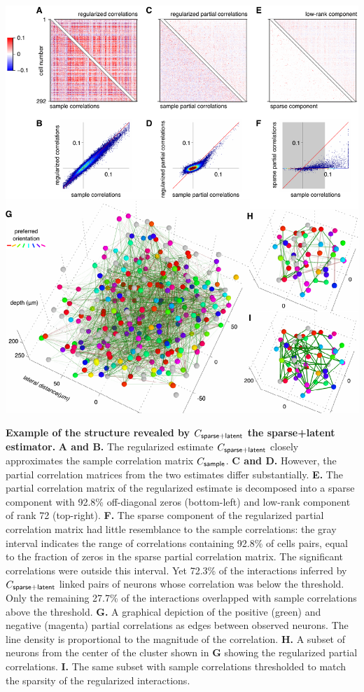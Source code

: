 \documentclass[10pt]{article}
\begin{document}
\begin{FPfigure}
    \begin{center}
        \includegraphics[width=17.35cm]{./figures/Figure04.pdf}
    \end{center}
    \caption{{\bf Example of the structure revealed by $C_{\sf sparse+latent}$ the sparse+latent estimator.}
    {\bf A and B.} The regularized estimate $C_{\sf sparse+latent}$ closely approximates the sample correlation matrix $C_{\sf sample}$. 
    {\bf C and D.} However, the partial correlation matrices from the two estimates differ substantially.
    {\bf E.} The partial correlation matrix of the regularized estimate is decomposed into a sparse component with 92.8\% off-diagonal zeros (bottom-left) and low-rank component of rank 72 (top-right).
    {\bf F.} The sparse component of the regularized partial correlation matrix had little resemblance to the sample correlations: the gray interval indicates the range of correlations containing 92.8\% of cells pairs, equal to the fraction of zeros in the sparse partial correlation matrix. The significant correlations were outside this interval. Yet 72.3\% of the interactions inferred by $C_{\sf sparse+latent}$  linked pairs of neurons whose correlation was below the threshold. Only the remaining 27.7\% of the interactions overlapped with sample correlations above the threshold.
    {\bf G.} A graphical depiction of the positive (green) and negative (magenta) partial correlations as edges between observed neurons. The line density is proportional to the magnitude of the correlation.
    {\bf H.} A subset of neurons from the center of the cluster shown in {\bf G} showing the regularized partial correlations.
    {\bf I.} The same subset with sample correlations thresholded to match the sparsity of the regularized interactions.
}
\label{fig:4}
\end{FPfigure}
\end{document}
